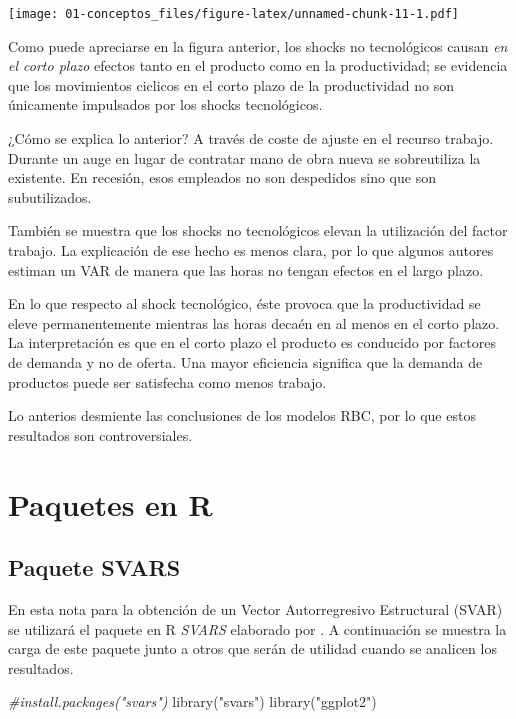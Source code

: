 \documentclass[
]{book}
\newenvironment{Shaded}{\begin{snugshade}}{\end{snugshade}}
\newcommand{\CommentTok}[1]{\textcolor[rgb]{0.56,0.35,0.01}{\textit{#1}}}
\newcommand{\FunctionTok}[1]{\textcolor[rgb]{0.00,0.00,0.00}{#1}}
\newcommand{\NormalTok}[1]{#1}
\newcommand{\StringTok}[1]{\textcolor[rgb]{0.31,0.60,0.02}{#1}}
\begin{document}
\texttt{[image: 01-conceptos\_files/figure-latex/unnamed-chunk-11-1.pdf]}

Como puede apreciarse en la figura anterior, los shocks no tecnológicos causan \emph{en el corto plazo} efectos tanto en el producto como en la productividad; se evidencia que los movimientos ciclicos en el corto plazo de la productividad no son únicamente impulsados por los shocks tecnológicos.

¿Cómo se explica lo anterior? A través de coste de ajuste en el recurso trabajo. Durante un auge en lugar de contratar mano de obra nueva se sobreutiliza la existente. En recesión, esos empleados no son despedidos sino que son subutilizados.

También se muestra que los shocks no tecnológicos elevan la utilización del factor trabajo. La explicación de ese hecho es menos clara, por lo que algunos autores estiman un VAR de manera que las horas no tengan efectos en el largo plazo.

En lo que respecto al shock tecnológico, éste provoca que la productividad se eleve permanentemente mientras las horas decaén en al menos en el corto plazo. La interpretación es que en el corto plazo el producto es conducido por factores de demanda y no de oferta. Una mayor eficiencia significa que la demanda de productos puede ser satisfecha como menos trabajo.

Lo anterios desmiente las conclusiones de los modelos RBC, por lo que estos resultados son controversiales.

\hypertarget{paquetes-en-r}{%
\chapter{Paquetes en R}\label{paquetes-en-r}}

\hypertarget{paquete-svars}{%
\section{Paquete SVARS}\label{paquete-svars}}

En esta nota para la obtención de un Vector Autorregresivo Estructural (SVAR) se utilizará el paquete en R \emph{SVARS} elaborado por \citet{SVAR21}. A continuación se muestra la carga de este paquete junto a otros que serán de utilidad cuando se analicen los resultados.

\begin{Shaded}
\begin{Highlighting}[]
\CommentTok{\#install.packages("svars")}
\FunctionTok{library}\NormalTok{(}\StringTok{"svars"}\NormalTok{)}
\FunctionTok{library}\NormalTok{(}\StringTok{"ggplot2"}\NormalTok{)}
\end{Highlighting}
\end{Shaded}
\end{document}
